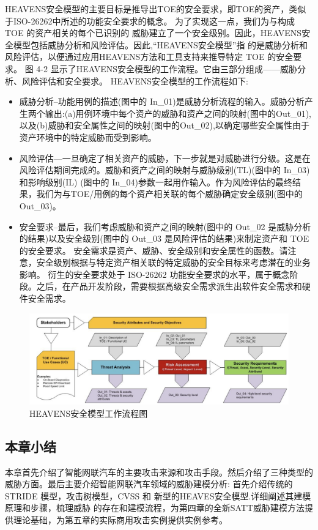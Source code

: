HEAVENS安全模型的主要目标是推导出TOE的安全要求，即TOE的资产，类似于ISO-26262中所述的功能安全要求的概念。
为了实现这一点，我们为与构成 TOE 的资产相关的每个已识别的
威胁建立了一个安全级别。因此，HEAVENS安全模型包括威胁分析和风险评估。因此,“HEAVENS安全模型”指
的是威胁分析和风险评估，以便通过应用HEAVENS方法和工具支持来推导特定 TOE 的安全要求。
图 4-2 显示了HEAVENS安全模型的工作流程。它由三部分组成——威胁分析、风险评估和安全要求。
HEAVENS安全模型的工作流程如下:
\begin{itemize}
    \item  威胁分析–功能用例的描述(图中的 In\_01)是威胁分析流程的输入。威胁分析产生两个输出:(a)用例环境中每个资产的威胁和资产之间的映射(图中的Out\_01),
    以及(b)威胁和安全属性之间的映射(图中的Out\_02),以确定哪些安全属性由于资产环境中的特定威胁而受到影响。
    \item  风险评估—一旦确定了相关资产的威胁，下一步就是对威胁进行分级。这是在风险评估期间完成的。威胁和资产之间的映射与威胁级别(TL)(图中的 In\_03)和影响级别(IL)
    (图中的 In\_04)参数一起用作输入。作为风险评估的最终结果，我们为与TOE/用例的每个资产相关联的每个威胁确定安全级别(图中的 Out\_03)。
    \item  安全要求–最后，我们考虑威胁和资产之间的映射(图中的 Out\_02 是威胁分析的结果)以及安全级别(图中的 Out\_03 是风险评估的结果)来制定资产和 TOE 的安全要求。
    安全需求是资产、威胁、安全级别和安全属性的函数。请注意，安全级别根据与特定资产相关联的特定威胁的安全目标来考虑潜在的业务影响。
    衍生的安全要求处于 ISO-26262 功能安全要求的水平，属于概念阶段。之后，在产品开发阶段，需要根据高级安全需求派生出软件安全需求和硬件安全需求。
  \end{itemize}


\begin{figure}
    \centering
    \includegraphics[scale=0.6]{resources/img/i11.png}
    \caption{HEAVENS安全模型工作流程图}
  \end{figure}

\subsection[]{本章小结}
本章首先介绍了智能网联汽车的主要攻击来源和攻击手段。然后介绍了三种类型的威胁方面。最后主要介绍智能网联汽车领域的威胁建模分析:
首先介绍传统的 STRIDE 模型，攻击树模型，CVSS 和 新型的HEAVES安全模型.详细阐述其建模原理和步骤，梳理威胁
的存在和建模流程，为第四章的全新SATT威胁建模方法提供理论基础，为第五章的实际商用攻击实例提供实例参考。